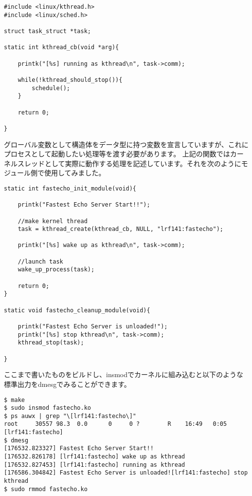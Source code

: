 \begin{verbatim}
#include <linux/kthread.h>
#include <linux/sched.h>

struct task_struct *task;

static int kthread_cb(void *arg){

    printk("[%s] running as kthread\n", task->comm);

    while(!kthread_should_stop()){
        schedule();
    }

    return 0;

}
\end{verbatim}

グローバル変数として構造体をデータ型に持つ変数を宣言していますが、これにプロセスとして起動したい処理等を渡す必要があります。
上記の関数ではカーネルスレッドとして実際に動作する処理を記述しています。それを次のようにモジュール側で使用してみました。

\begin{verbatim}
static int fastecho_init_module(void){

    printk("Fastest Echo Server Start!!");

    //make kernel thread
    task = kthread_create(kthread_cb, NULL, "lrf141:fastecho");
        
    printk("[%s] wake up as kthread\n", task->comm);

    //launch task
    wake_up_process(task);
        
    return 0;
}

static void fastecho_cleanup_module(void){

    printk("Fastest Echo Server is unloaded!");
    printk("[%s] stop kthread\n", task->comm);
    kthread_stop(task);

}
\end{verbatim}

ここまで書いたものをビルドし、insmodでカーネルに組み込むと以下のような標準出力をdmesgでみることができます。
\begin{verbatim}
$ make
$ sudo insmod fastecho.ko
$ ps auwx | grep "\[lrf141:fastecho\]"
root     30557 98.3  0.0      0     0 ?        R    16:49   0:05 [lrf141:fastecho]
$ dmesg
[176532.823327] Fastest Echo Server Start!!
[176532.826178] [lrf141:fastecho] wake up as kthread
[176532.827453] [lrf141:fastecho] running as kthread
[176586.304842] Fastest Echo Server is unloaded![lrf141:fastecho] stop kthread
$ sudo rmmod fastecho.ko
\end{verbatim}

